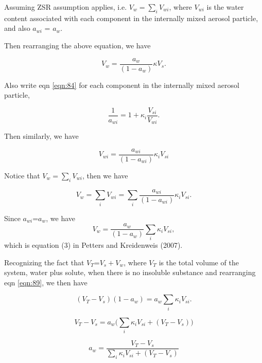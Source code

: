\documentclass[12pt]{article}
\begin{document}
\begin{itemize}
Assuming ZSR assumption applies, i.e.  $ V_w = \sum_{i} V_{wi}$, where $V_{wi}$ is the water content associated with each component in the internally mixed aerosol particle, and also $a_{wi}$ = $ a_{w}$. 

Then rearranging the above equation, we have

\begin{equation}\label{eqn:85}
V_w = \frac {a_{w}}{(1-a_{w})} \kappa V_{s}. 
\end{equation} 
 
Also write eqn \ref{eqn:84} for each component in the internally mixed aerosol particle, 

\begin{equation}\label{eqn:86}
 \frac{1}{a_{wi}}=1+\kappa_{i} \frac{V_{si}}{V_{wi}}.
\end{equation} 

Then similarly, we have 

\begin{equation}\label{eqn:87}
V_{wi} = \frac {a_{wi}}{(1-a_{wi})} \kappa_{i} V_{si}
\end{equation}

Notice that $ V_w = \sum_{i} V_{wi}$, then we have

\begin{equation}\label{eqn:88}
V_{w} = \sum_{i} V_{wi} = \sum_{i} \frac {a_{wi}}{(1-a_{wi})} \kappa_{i} V_{si}.
\end{equation}

Since $a_{wi}$=$a_{w}$, we have
\begin{equation}\label{eqn:89}
V_{w}  = \frac {a_{w}}{(1-a_{w})} \sum_{i} \kappa_{i} V_{si},
\end{equation}
which is equation (3) in Petters and Kreidenweis (2007).

Recognizing the fact that $V_{T}$=$V_{s}+V_{w}$, where $V_{T}$ is the total volume of the system, water plus solute, when there is no insoluble substance and rearranging eqn \ref{eqn:89}, we then have

\begin{equation}
(V_{T}-V_{s}) (1-a_{w})=a_{w}\sum_{i} \kappa_{i} V_{si}.
\end{equation}


\begin{equation}
V_{T}-V_{s} =a_{w}\Big( \sum_{i} \kappa_{i} V_{si} +(V_{T}-V_{s}) \Big)
\end{equation}


\begin{equation}
a_{w}= \frac {V_{T}-V_{s} }{\sum_{i} \kappa_{i} V_{si} +(V_{T}-V_{s})}
\end{equation}



\end{itemize}
\end{document}
